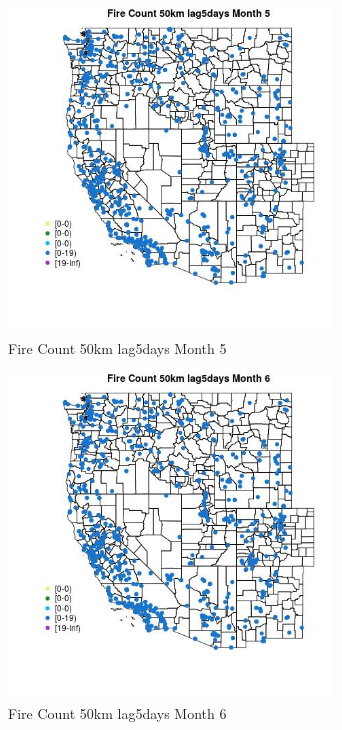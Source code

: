 \begin{figure} 
\centering  
\includegraphics[width=0.77\textwidth]{Code_Outputs/Report_ML_input_PM25_Step4_part_e_de_duplicated_aves_compiled_2019-05-21wNAs_MapObsMo5Fire_Count_50km_lag5days.jpg} 
\caption{\label{fig:Report_ML_input_PM25_Step4_part_e_de_duplicated_aves_compiled_2019-05-21wNAsMapObsMo5Fire_Count_50km_lag5days}Fire Count 50km lag5days Month 5} 
\end{figure} 
 

\clearpage 

\begin{figure} 
\centering  
\includegraphics[width=0.77\textwidth]{Code_Outputs/Report_ML_input_PM25_Step4_part_e_de_duplicated_aves_compiled_2019-05-21wNAs_MapObsMo6Fire_Count_50km_lag5days.jpg} 
\caption{\label{fig:Report_ML_input_PM25_Step4_part_e_de_duplicated_aves_compiled_2019-05-21wNAsMapObsMo6Fire_Count_50km_lag5days}Fire Count 50km lag5days Month 6} 
\end{figure} 
 

